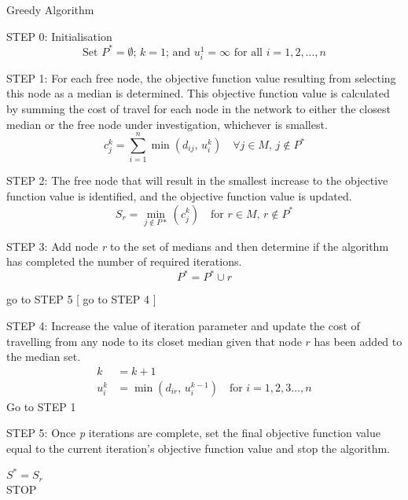\documentclass[11pt]{article}
\begin{document}
	\begin{algorithm}
	\caption{Greedy Algorithm}
	\begin{algorithmic}[0]
		
		\Statex
		\Statex STEP 0: Initialisation	
		\begin{equation*}
			\text{Set } P^{*} = \emptyset \text{; } k = 1\text{; and }u_i^1 = \infty\text{ for all } i=1,2,\dots,n
		\end{equation*}

		\Statex 
		\Statex STEP 1: For each free node, the objective function value resulting from selecting this node as a median is determined.  This objective function value is calculated by summing the cost of travel for each node in the network to either the closest median or the free node under investigation, whichever is smallest.
		\begin{equation*}
			c_j^k = \sum_{i=1}^{n}\min(d_{ij} \text{, } u_i^k) \quad \forall j \in M \text{, } j \notin P^*
		\end{equation*}

		\Statex 
		\Statex STEP 2: The free node that will result in the smallest increase to the objective function value is identified, and the objective function value is updated.
		\begin{equation*}
			S_r = \min_{j \notin P*}(c_j^k) \quad \text{for } r \in M \text{, } r \notin P^*
		\end{equation*}
		
		\Statex 
		\Statex STEP 3: Add node \emph{r} to the set of medians and then determine if the algorithm has completed the number of required iterations.
		\begin{equation*}
		P^* = P^* \cup r
		\end{equation*}
		
			\Statex go to STEP 5
		[
		\Else
			\Statex go to STEP 4
		]
		\EndIf
		
		\Statex 
		\Statex STEP 4: Increase the value of iteration parameter and update the cost of travelling from any node to its closet median given that node $r$ has been added to the median set.
		\begin{align*}
		k &= k+1\\
		u_i^k &= \min(d_{ir} \text{, } u_i^{k-1}) \quad \text{for } i = 1,2,3 \dots,n
		\end{align*}
		\Statex Go to STEP 1
		
		\Statex 
		\Statex STEP 5: Once \emph{p} iterations are complete, set the final objective function value equal to the current iteration's objective function value and stop the algorithm.
		\begin{center}
		$S^{*} = S_r$\\
		STOP
		\end{center}
		
		
	\end{algorithmic}
	\end{algorithm}
\end{document}
